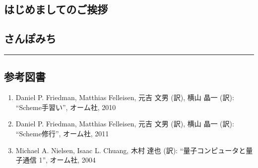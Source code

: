 \def\hline{\begin{center}\rule{.99\textwidth}{0.4pt}\end{center}}

\fontsize{10pt}{10pt}
\selectfont

\def\page#1#2{
\hline
\begin{minipage}{.01\hsize}
  ~
\end{minipage}
\begin{minipage}{.39\hsize}
#1
\end{minipage}
\begin{minipage}{.10\hsize}
  ~
\end{minipage}
\begin{minipage}{.39\hsize}
#2
\end{minipage}
}

\subsection*{はじめましてのご挨拶}


\newpage
\subsection*{さんぽみち}


\hline

\subsection*{参考図書}
\begin{enumerate}
  \item
    Daniel P. Friedman, Matthias Felleisen, 元吉 文男 (訳), 横山 晶一 (訳):
    ``Scheme手習い'', オーム社, 2010
  \item
    Daniel P. Friedman, Matthias Felleisen, 元吉 文男 (訳), 横山 晶一 (訳):
    ``Scheme修行'', オーム社, 2011
  \item
    Michael A. Nielsen, Isaac L. Chuang, 木村 達也 (訳):
    ``量子コンピュータと量子通信 1'', オーム社, 2004
\end{enumerate}

